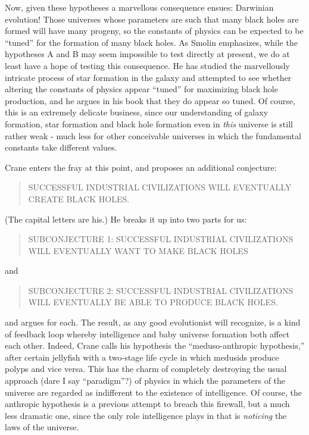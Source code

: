 \documentclass{article}
\begin{document}
Now, given these hypotheses a marvellous consequence ensues: Darwinian
evolution! Those universes whose parameters are such that many black
holes are formed will have many progeny, so the constants of physics can
be expected to be ``tuned'' for the formation of many black holes. As
Smolin emphasizes, while the hypotheses A and B may seem impossible to
test directly at present, we do at least have a hope of testing this
consequence. He has studied the marvellously intricate process of star
formation in the galaxy and attempted to see whether altering the
constants of physics appear ``tuned'' for maximizing black hole
production, and he argues in his book that they do appear so tuned. Of
course, this is an extremely delicate business, since our understanding
of galaxy formation, star formation and black hole formation even in
\emph{this} universe is still rather weak - much less for other
conceivable universes in which the fundamental constants take different
values.

Crane enters the fray at this point, and proposes an additional
conjecture:

\begin{quote}
SUCCESSFUL INDUSTRIAL CIVILIZATIONS WILL EVENTUALLY CREATE BLACK HOLES.
\end{quote}

(The capital letters are his.) He breaks it up into two parts for us:

\begin{quote}
SUBCONJECTURE 1: SUCCESSFUL INDUSTRIAL CIVILIZATIONS WILL EVENTUALLY
WANT TO MAKE BLACK HOLES
\end{quote}

and

\begin{quote}
SUBCONJECTURE 2: SUCCESSFUL INDUSTRIAL CIVILIZATIONS WILL EVENTUALLY BE
ABLE TO PRODUCE BLACK HOLES.
\end{quote}

and argues for each. The result, as any good evolutionist will
recognize, is a kind of feedback loop whereby intelligence and baby
universe formation both affect each other. Indeed, Crane calls his
hypothesis the ``meduso-anthropic hypothesis,'' after certain jellyfish
with a two-stage life cycle in which medusids produce polyps and vice
versa. This has the charm of completely destroying the usual approach
(dare I say ``paradigm''?) of physics in which the parameters of the
universe are regarded as indifferent to the existence of intelligence.
Of course, the anthropic hypothesis is a previous attempt to breach this
firewall, but a much less dramatic one, since the only role intelligence
plays in that is \emph{noticing} the laws of the universe.
\end{document}
